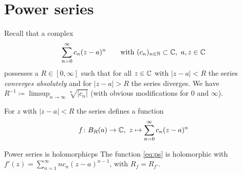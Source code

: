 \documentclass[a4paper,english]{article}
\begin{document}
\section{Power series}
Recall that a complex 
\begin{equation*}
    \sum_{n = 0}^{\infty} c_n (z - a)^n \qquad \text{with }
    (c_n)_{n \in \operatorname{\mathbb{N}}} \subset \operatorname{\mathbb{C}}, \ a, z \in \operatorname{\mathbb{C}}
\end{equation*}
possesses a  $R \in [0, \infty]$ such that for all $z \in \operatorname{\mathbb{C}}$ with $| z - a | < R$ the series \emph{converges absolutely} and for $| z - a | > R$ the series diverges.
We have $R^{-1} \coloneqq \limsup_{n \to \infty} \sqrt[n]{| c_n |}$ (with obvious modifications for $0$ and $\infty$).

For $z$ with $| z - a | < R$ the series defines a function
\begin{equation} \label{eq:ps}
    f \colon B_R(a) \to \operatorname{\mathbb{C}}, \
    z \mapsto \sum_{n = 0}^{\infty} c_n (z - a)^n
\end{equation}

\begin{thm}{Power series is holomorphic}{ps}
    The function \eqref{eq:ps} is holomorphic with $f'(z) = \sum_{n = 1}^{\infty} n c_n (z - a)^{n - 1}$, with $R_f = R_{f'}$.
\end{thm}
\end{document}
